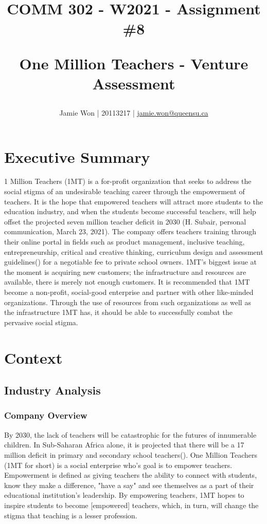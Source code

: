 \documentclass[letterpaper]{article}
\title{
    COMM 302 - W2021 - Assignment \#8 \\
    \begin{large}
        One Million Teachers - Venture Assessment
    \end{large}
}
\author{
    Jamie Won | 20113217 | \href{mailto:jamie.won@queensu.ca}{jamie.won@queensu.ca}
}
\begin{document}
\maketitle
\tableofcontents
\listoffigures

\cleardoublepage
\section{Executive Summary}

1 Million Teachers (1MT) is a for-profit organization that seeks to address the social stigma of an undesirable teaching career through the empowerment of teachers. It is the hope that empowered teachers will attract more students to the education industry, and when the students become successful teachers, will help offset the projected seven million teacher deficit in 2030 (H. Subair, personal communication, March 23, 2021). The company offers teachers training through their online portal in fields such as product management, inclusive teaching, entrepreneurship, critical and creative thinking, curriculum design and assessment guidelines(\cite{companysite-programs}) for a negotiable fee to private school owners. 1MT's biggest issue at the moment is acquiring new customers; the infrastructure and resources are available, there is merely not enough customers. It is recommended that 1MT become a non-profit, social-good enterprise and partner with other like-minded organizations. Through the use of resources from such organizations as well as the infrastructure 1MT has, it should be able to successfully combat the pervasive social stigma.

\section{Context}

    \subsection{Industry Analysis}
        
        \subsubsection{Company Overview}
            
            By 2030, the lack of teachers will be catastrophic for the futures of innumerable children. In Sub-Saharan Africa alone, it is projected that there will be a 17 million deficit in primary and secondary school teachers(\cite{companysite-about}). One Million Teachers (1MT for short) is a social enterprise who's goal is to empower teachers. Empowerment is defined as giving teachers the ability to connect with students, know they make a difference, "have a say" and see themselves as a part of their educational institution's leadership. By empowering teachers, 1MT hopes to inspire students to become [empowered] teachers, which, in turn, will change the stigma that teaching is a lesser profession.
\end{document}

